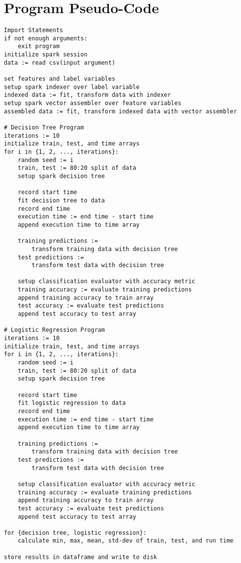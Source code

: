 \documentclass[12pt, letterpaper]{article}
\begin{document}
\section{Program Pseudo-Code}
\begin{verbatim}
Import Statements
if not enough arguments:
    exit program
initialize spark session
data := read csv(input argument)

set features and label variables
setup spark indexer over label variable
indexed data := fit, transform data with indexer
setup spark vector assembler over feature variables
assembled data := fit, transform indexed data with vector assembler

# Decision Tree Program
iterations := 10
initialize train, test, and time arrays
for i in {1, 2, ..., iterations}:
    random seed := i
    train, test := 80:20 split of data
    setup spark decision tree

    record start time
    fit decision tree to data
    record end time
    execution time := end time - start time
    append execution time to time array

    training predictions := 
        transform training data with decision tree
    test predictions := 
        transform test data with decision tree

    setup classification evaluator with accuracy metric    
    training accuracy := evaluate training predictions
    append training accuracy to train array    
    test accuracy := evaluate test predictions
    append test accuracy to test array

# Logistic Regression Program
iterations := 10
initialize train, test, and time arrays
for i in {1, 2, ..., iterations}:
    random seed := i
    train, test := 80:20 split of data
    setup spark decision tree

    record start time
    fit logistic regression to data
    record end time
    execution time := end time - start time
    append execution time to time array

    training predictions := 
        transform training data with decision tree
    test predictions := 
        transform test data with decision tree

    setup classification evaluator with accuracy metric    
    training accuracy := evaluate training predictions
    append training accuracy to train array    
    test accuracy := evaluate test predictions
    append test accuracy to test array

for {decision tree, logistic regression}:
    calculate min, max, mean, std-dev of train, test, and run time

store results in dataframe and write to disk    
\end{verbatim}
\end{document}
